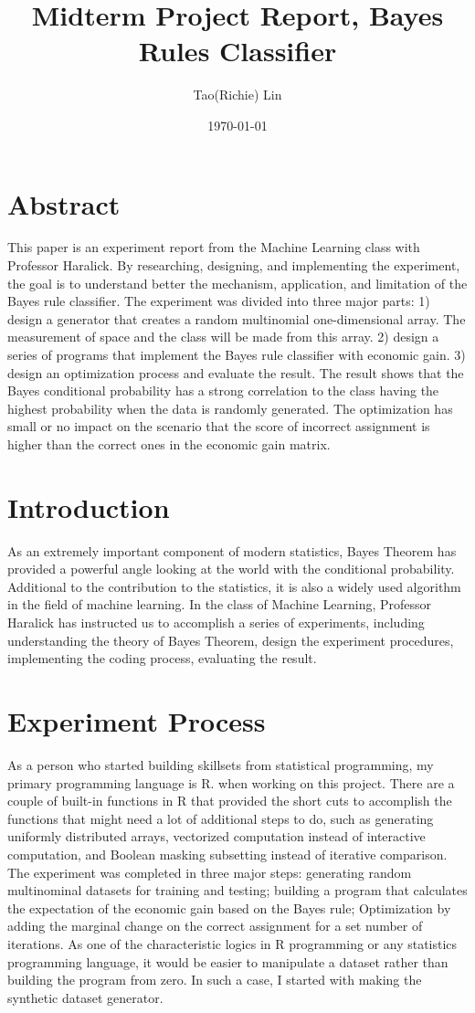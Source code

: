 \documentclass{article}
\title{Midterm Project Report, Bayes Rules Classifier}
\author{Tao(Richie) Lin}
\date{\today}
\begin{document}
\maketitle
\begin{multicols}{2}
\section{Abstract}
This paper is an experiment report from the Machine Learning class with Professor Haralick. By researching, designing, and implementing the experiment, the goal is to understand better the mechanism, application, and limitation of the Bayes rule classifier.
The experiment was divided into three major parts: 1) design a generator that creates a random multinomial one-dimensional array. The measurement of space and the class will be made from this array. 2) design a series of programs that implement the Bayes rule classifier with economic gain. 3) design an optimization process and evaluate the result.
The result shows that the Bayes conditional probability has a strong correlation to the class having the highest probability when the data is randomly generated. The optimization has small or no impact on the scenario that the score of incorrect assignment is higher than the correct ones in the economic gain matrix. 
\section{Introduction}
As an extremely important component of modern statistics, Bayes Theorem has provided a powerful angle looking at the world with the conditional probability. Additional to the contribution to the statistics, it is also a widely used algorithm in the field of machine learning. In the class of Machine Learning, Professor Haralick has instructed us to accomplish a series of experiments, including understanding the theory of Bayes Theorem, design the experiment procedures, implementing the coding process, evaluating the result.
\section{Experiment Process}
As a person who started building skillsets from statistical programming, my primary programming language is R. when working on this project. There are a couple of built-in functions in R that provided the short cuts to accomplish the functions that might need a lot of additional steps to do, such as generating uniformly distributed arrays, vectorized computation instead of interactive computation, and Boolean masking subsetting instead of iterative comparison.
The experiment was completed in three major steps: generating random multinominal datasets for training and testing; building a program that calculates the expectation of the economic gain based on the Bayes rule; Optimization by adding the marginal change on the correct assignment for a set number of iterations.
As one of the characteristic logics in R programming or any statistics programming language, it would be easier to manipulate a dataset rather than building the program from zero. In such a case, I started with making the synthetic dataset generator. 

\end{multicols}
\end{document}

